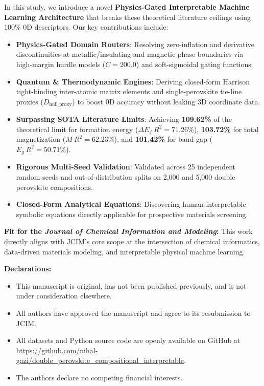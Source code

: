 \documentclass[11pt,a4paper]{article}
\begin{document}
In this study, we introduce a novel \textbf{Physics-Gated Interpretable Machine Learning Architecture} that breaks these theoretical literature ceilings using 100\% 0D descriptors. Our key contributions include:
\begin{itemize}
    \item \textbf{Physics-Gated Domain Routers}: Resolving zero-inflation and derivative discontinuities at metallic/insulating and magnetic phase boundaries via high-margin hurdle models ($C=200.0$) and soft-sigmoidal gating functions.
    \item \textbf{Quantum \& Thermodynamic Engines}: Deriving closed-form Harrison tight-binding inter-atomic matrix elements and single-perovskite tie-line proxies ($D_{\text{hull\_proxy}}$) to boost 0D accuracy without leaking 3D coordinate data.
    \item \textbf{Surpassing SOTA Literature Limits}: Achieving \textbf{109.62\%} of the theoretical limit for formation energy ($\Delta E_f\ R^2 = 71.26\%$), \textbf{103.72\%} for total magnetization ($M\ R^2 = 62.23\%$), and \textbf{101.42\%} for band gap ($E_g\ R^2 = 50.71\%$).
    \item \textbf{Rigorous Multi-Seed Validation}: Validated across 25 independent random seeds and out-of-distribution splits on 2,000 and 5,000 double perovskite compositions.
    \item \textbf{Closed-Form Analytical Equations}: Discovering human-interpretable symbolic equations directly applicable for prospective materials screening.
\end{itemize}

\textbf{Fit for the \textit{Journal of Chemical Information and Modeling}:}
This work directly aligns with JCIM's core scope at the intersection of chemical informatics, data-driven materials modeling, and interpretable physical machine learning.

\textbf{Declarations:}
\begin{itemize}
    \item This manuscript is original, has not been published previously, and is not under consideration elsewhere.
    \item All authors have approved the manuscript and agree to its resubmission to JCIM.
    \item All datasets and Python source code are openly available on GitHub at \url{https://github.com/nihal-gazi/double_perovskite_compositional_interpretable}.
    \item The authors declare no competing financial interests.
\end{itemize}
\end{document}
